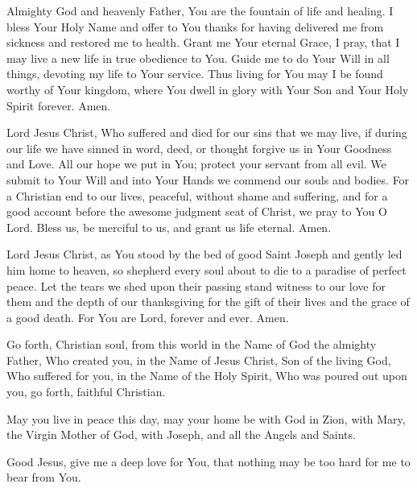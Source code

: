 Almighty God and heavenly Father, You are the fountain of life and healing.
I bless Your Holy Name and offer to You thanks for having delivered me from sickness and restored me to health.
Grant me Your eternal Grace, I pray, that I may live a new life in true obedience to You.
Guide me to do Your Will in all things, devoting my life to Your service.
Thus living for You may I be found worthy of Your kingdom, where You dwell in glory with Your Son and Your Holy Spirit forever.
Amen.

Lord Jesus Christ, Who suffered and died for our sins that we may live, if during our life we have sinned in word, deed, or thought forgive us in Your Goodness and Love.
All our hope we put in You;
protect your servant \insertname from all evil.
We submit to Your Will and into Your Hands we commend our souls and bodies.
For a Christian end to our lives, peaceful, without shame and suffering, and for a good account before the awesome judgment seat of Christ, we pray to You O Lord.
Bless us, be merciful to us, and grant us life eternal.
Amen.

Lord Jesus Christ, as You stood by the bed of good Saint Joseph and gently led him home to heaven, so shepherd every soul about to die to a paradise of perfect peace.
Let the tears we shed upon their passing stand witness to our love for them and the depth of our thanksgiving for the gift of their lives and the grace of a good death.
For You are Lord, forever and ever.
Amen.

Go forth, Christian soul, from this world in the Name of God the almighty Father, Who created you, in the Name of Jesus Christ, Son of the living God, Who suffered for you, in the Name of the Holy Spirit, Who was poured out upon you, go forth, faithful Christian.

May you live in peace this day, may your home be with God in Zion, with Mary, the Virgin Mother of God, with Joseph, and all the Angels and Saints.

Good Jesus, give me a deep love for You, that nothing may be too hard for me to bear from You.


